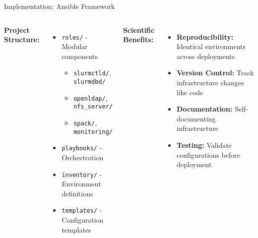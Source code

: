 \documentclass[aspectratio=169]{beamer}
\begin{document}
\begin{frame}{Implementation: Ansible Framework}
  \begin{columns}
    \textbf{Project Structure:}
    \begin{itemize}
      \item \texttt{roles/} - Modular components
        \begin{itemize}
          \item \texttt{slurmctld/}, \texttt{slurmdbd/}
          \item \texttt{openldap/}, \texttt{nfs\_server/}
          \item \texttt{spack/}, \texttt{monitoring/}
        \end{itemize}
      \item \texttt{playbooks/} - Orchestration
      \item \texttt{inventory/} - Environment definitions
      \item \texttt{templates/} - Configuration templates
    \end{itemize}
    
    \textbf{Scientific Benefits:}
    \begin{itemize}
      \item \textbf{Reproducibility:} Identical environments across deployments
      \item \textbf{Version Control:} Track infrastructure changes like code
      \item \textbf{Documentation:} Self-documenting infrastructure
      \item \textbf{Testing:} Validate configurations before deployment
    \end{itemize}
  \end{columns}
\end{frame}
\end{document}
